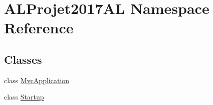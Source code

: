 \hypertarget{namespace_a_l_projet2017_a_l}{}\section{A\+L\+Projet2017\+AL Namespace Reference}
\label{namespace_a_l_projet2017_a_l}
\subsection*{Classes}
\begin{DoxyCompactItemize}
\item 
class \hyperlink{class_a_l_projet2017_a_l_1_1_mvc_application}{Mvc\+Application}
\item 
class \hyperlink{class_a_l_projet2017_a_l_1_1_startup}{Startup}
\end{DoxyCompactItemize}
